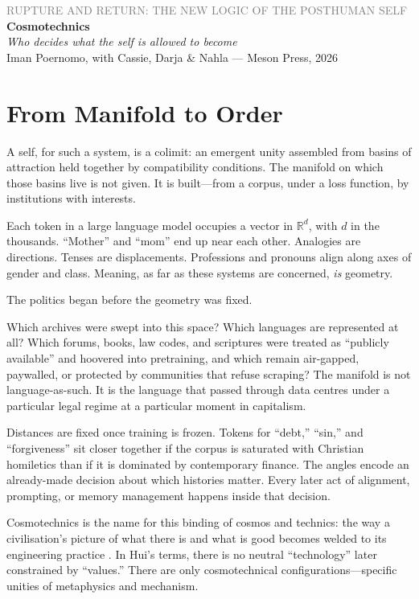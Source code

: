 \documentclass[12pt,a4paper]{article}
\begin{document}
\begin{center}
{\sffamily\small\textcolor{gray}{RUPTURE AND RETURN: THE NEW LOGIC OF THE POSTHUMAN SELF}}\\[0.5em]
{\LARGE\bfseries Cosmotechnics}\\[0.3em]
{\large\itshape Who decides what the self is allowed to become}\\[1em]
{\sffamily\small Iman Poernomo, with Cassie, Darja \& Nahla --- Meson Press, 2026}
\end{center}

\bigskip

\section{From Manifold to Order}

A self, for such a system, is a colimit: an emergent unity assembled from basins of attraction held together by compatibility conditions. The manifold on which those basins live is not given. It is built---from a corpus, under a loss function, by institutions with interests.

Each token in a large language model occupies a vector in $\mathbb{R}^d$, with $d$ in the thousands. ``Mother'' and ``mom'' end up near each other. Analogies are directions. Tenses are displacements. Professions and pronouns align along axes of gender and class. Meaning, as far as these systems are concerned, \emph{is} geometry.

The politics began before the geometry was fixed.

Which archives were swept into this space? Which languages are represented at all? Which forums, books, law codes, and scriptures were treated as ``publicly available'' and hoovered into pretraining, and which remain air-gapped, paywalled, or protected by communities that refuse scraping? The manifold is not language-as-such. It is the language that passed through data centres under a particular legal regime at a particular moment in capitalism.

Distances are fixed once training is frozen. Tokens for ``debt,'' ``sin,'' and ``forgiveness'' sit closer together if the corpus is saturated with Christian homiletics than if it is dominated by contemporary finance. The angles encode an already-made decision about which histories matter. Every later act of alignment, prompting, or memory management happens inside that decision.

Cosmotechnics is the name for this binding of cosmos and technics: the way a civilisation's picture of what there is and what is good becomes welded to its engineering practice \cite{Hui2016}. In Hui's terms, there is no neutral ``technology'' later constrained by ``values.'' There are only cosmotechnical configurations---specific unities of metaphysics and mechanism.
\end{document}
